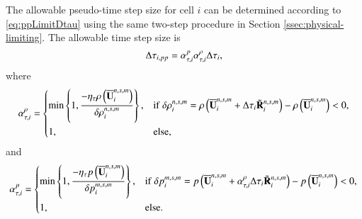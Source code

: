 The allowable pseudo-time step size for cell $i$ can be determined according to \eqref{eq:ppLimitDtau}
using the same two-step procedure in Section \ref{ssec:physical-limiting}.
The allowable time step size is 
\begin{equation}
    \label{eq:alpha-tau}
    \mathrm\Delta \tau_{i,pp}= \alpha_{\tau,i}^{p}\alpha_{\tau,i}^{\rho} \mathrm\Delta  \tau_{i},
\end{equation}
where
\begin{equation}
    \label{eq:alpha-tau-rho}
    \alpha_{\tau,i}^{\rho} = \begin{dcases}
        \min\left\{1, \dfrac{-\eta_\tau \rho\left(\overline{\mathbf{U}}^{n,s,m}_i\right)}{\delta \rho_i^{n,s,m}} \right\}, & \mathrm{if} \ \delta \rho_i^{n,s,m}= \rho\left(\overline{\mathbf{U}}^{n,s,m}_i + \mathrm\Delta \tau_{i} \tilde{\mathbf{R}}^{n,s,m}_i\right) - \rho\left(\overline{\mathbf{U}}^{n,s,m}_i\right) < 0, \\
        1, & \mathrm{else},
    \end{dcases}
\end{equation}
and
\begin{equation}
    \label{eq:alpha-tau-p}
    \alpha_{\tau,i}^{p} = \begin{dcases}
        \min\left\{1, \dfrac{-\eta_\tau p \left(\overline{\mathbf{U}}^{n,s,m}_i\right)}{\delta p_i^{m,s,m}} \right\}, & \mathrm{if} \ \delta p_i^{m,s,m} = p \left(\overline{\mathbf{U}}^{n,s,m}_i + \alpha_{\tau,i}^{\rho} \mathrm\Delta \tau_{i} \tilde{\mathbf{R}}^{n,s,m}_i\right) -p \left(\overline{\mathbf{U}}^{n,s,m}_i\right) < 0, \\
        1, &\mathrm{else}.
    \end{dcases}
\end{equation}

